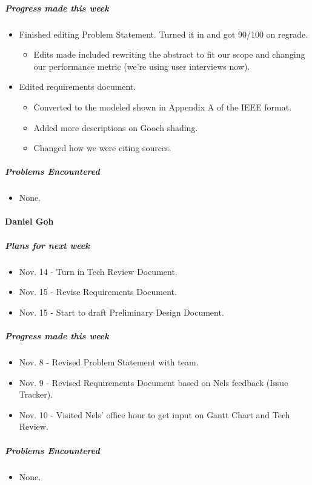{\subparagraph{Progress made this week}
\begin{itemize}
  \item Finished editing Problem Statement. Turned it in and got 90/100 on regrade.
  \begin{itemize}
    \item Edits made included rewriting the abstract to fit our scope and changing our performance metric (we're using user interviews now).
  \end{itemize}
  \item Edited requirements document.
  \begin{itemize}
	\item Converted to the modeled shown in Appendix A of the IEEE format.
	\item Added more descriptions on Gooch shading.
	\item Changed how we were citing sources.
  \end{itemize}
\end{itemize}

\subparagraph{Problems Encountered}
\begin{itemize}
  \item None.
\end{itemize}

\vspace{3mm}

\paragraph{Daniel Goh}
\subparagraph{Plans for next week}
\begin{itemize}
  \item Nov. 14 - Turn in Tech Review Document.
  \item Nov. 15 - Revise Requirements Document.
  \item Nov. 15 - Start to draft Preliminary Design Document.
\end{itemize}

\subparagraph{Progress made this week}
\begin{itemize}
  \item Nov. 8 - Revised Problem Statement with team.
  \item Nov. 9 - Revised Requirements Document based on Nels feedback (Issue Tracker).
  \item Nov. 10 - Visited Nels' office hour to get input on Gantt Chart and Tech Review.
\end{itemize}

\subparagraph{Problems Encountered}
\begin{itemize}
  \item None.
\end{itemize}

}

